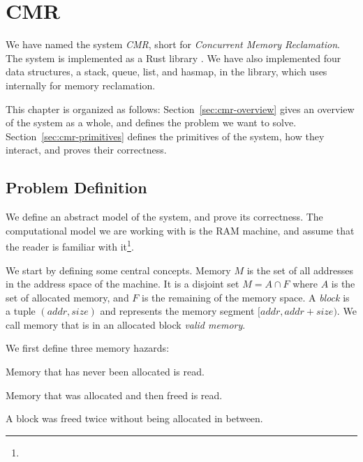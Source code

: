 \chapter{CMR}

We have named the system \emph{CMR}, short for \emph{Concurrent Memory Reclamation}. The system is
implemented as a Rust library . We have also implemented four data structures, a stack,
queue, list, and hasmap, in the  library, which uses 
internally for memory reclamation.

This chapter is organized as follows:
Section~\ref{sec:cmr-overview} gives an overview of the system as a whole, and defines the problem
we want to solve.
Section~\ref{sec:cmr-primitives} defines the primitives of the system, how they interact, and
proves their correctness.

\section{Problem Definition}

We define an abstract model of the system, and prove its correctness.
The computational model we are working with is the RAM machine, and assume that
the reader is familiar with it\footnote{}.

We start by defining some central concepts.
Memory $M$ is the set of all addresses in the address space of the machine.
It is a disjoint set $M = A \cap F$ where $A$ is the set of allocated memory, and $F$ is the
remaining of the memory space.
A \emph{block} is a tuple $(addr, size)$ and represents the memory segment $[addr, addr + size)$.
We call memory that is in an allocated block \emph{valid memory}.





We first define three memory hazards:

\begin{definition}
  Memory that has never been allocated is read.
\end{definition}

\begin{definition}
  Memory that was allocated and then freed is read.
\end{definition}

\begin{definition}
  A block was freed twice without being allocated in between.
\end{definition}

